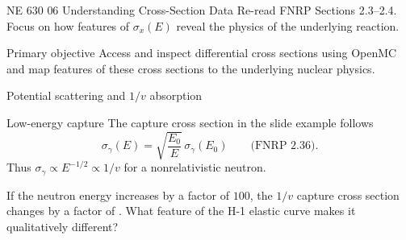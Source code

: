 
\HandoutSetup
  {NE 630}
  {06}
  {Understanding Cross-Section Data}
  {Re-read FNRP Sections 2.3--2.4. Focus on how features of $\sigma_x(E)$ reveal the physics of the underlying reaction.}


\MakeHandoutTitle

\begin{handoutcolumns}

\begin{fixedbox}{Primary objective}
Access and inspect differential cross sections using OpenMC and map features
of these cross sections to the underlying nuclear physics.
\end{fixedbox}





\begin{fixedbox}{Potential scattering and $1/v$ absorption}
\centering
{}
\end{fixedbox}

\begin{fixedbox}{Low-energy capture}
The capture cross section in the slide example follows
\[
 \boxed{\sigma_{\gamma}(E)
   = \sqrt{\frac{E_0}{E}}\,\sigma_{\gamma}(E_0)}
 \qquad\text{(FNRP 2.36)}.
\]
Thus $\sigma_\gamma\propto E^{-1/2}\propto 1/v$ for a nonrelativistic neutron.
\end{fixedbox}

\begin{checkpoint}[$1/v$ check]
If the neutron energy increases by a factor of $100$, the $1/v$ capture cross
section changes by a factor of \MathBlank[0.72in]{}.
What feature of the H-1 elastic curve makes it qualitatively different?
\end{checkpoint}


\end{handoutcolumns}
